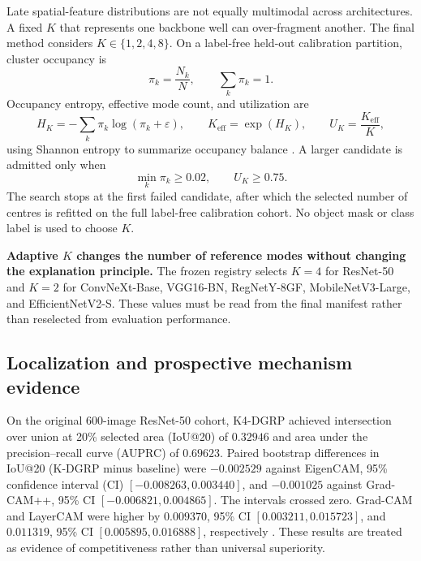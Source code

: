 Late spatial-feature distributions are not equally multimodal across
architectures. A fixed $K$ that represents one backbone well can over-fragment
another. The final method considers $K\in\{1,2,4,8\}$. On a label-free held-out
calibration partition, cluster occupancy is
\begin{equation}
    \pi_k=\frac{N_k}{N},\qquad \sum_k\pi_k=1.
\end{equation}
Occupancy entropy, effective mode count, and utilization are
\begin{equation}
    H_K=-\sum_k\pi_k\log(\pi_k+\varepsilon),
    \qquad K_{\mathrm{eff}}=\exp(H_K),
    \qquad U_K=\frac{K_{\mathrm{eff}}}{K},
\end{equation}
using Shannon entropy to summarize occupancy balance
\cite{shannon1948entropy}. A larger candidate is admitted only when
\begin{equation}
    \min_k\pi_k\geq0.02,
    \qquad U_K\geq0.75.
    \label{eq:kselector}
\end{equation}
The search stops at the first failed candidate, after which the selected number
of centres is refitted on the full label-free calibration cohort. No object
mask or class label is used to choose $K$.

\textbf{Adaptive $K$ changes the number of reference modes without changing the
explanation principle.} The frozen registry selects $K=4$ for ResNet-50 and
$K=2$ for ConvNeXt-Base, VGG16-BN, RegNetY-8GF, MobileNetV3-Large, and
EfficientNetV2-S. These values must be read from the final manifest rather than
reselected from evaluation performance.

\subsection{Localization and prospective mechanism evidence}

On the original 600-image ResNet-50 cohort, K4-DGRP achieved intersection over
union at 20\% selected area (IoU@20) of $0.32946$ and area under the
precision--recall curve (AUPRC) of $0.69623$. Paired bootstrap differences in
IoU@20 (K-DGRP minus baseline) were $-0.002529$ against EigenCAM, 95\%
confidence interval (CI) $[-0.008263,0.003440]$, and $-0.001025$ against
Grad-CAM++, 95\% CI $[-0.006821,0.004865]$. The intervals crossed zero.
Grad-CAM and LayerCAM were higher by $0.009370$, 95\% CI
$[0.003211,0.015723]$, and $0.011319$, 95\% CI
$[0.005895,0.016888]$, respectively \cite{chan2026kdgrp}. These results are
treated as evidence of competitiveness rather than universal superiority.

